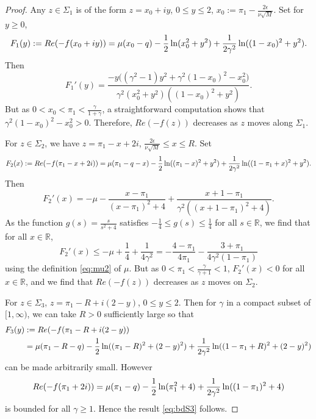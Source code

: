 \documentclass[11pt]{article}
\begin{document}
\begin{proof}
Any $z\in \Sigma_1$ is of the form $z=x_0+iy$, $0\le y\le 2$,
$x_0:=\pi_1-\frac{2\epsilon}{\nu\sqrt{M}}$. Set for $y\ge 0$,
\begin{equation}
  F_1(y):= Re(-f(x_0+iy))
= \mu(x_0-q) - \frac12 \ln(x_0^2+y^2) + \frac1{2\gamma^2}
\ln((1-x_0)^2+y^2).
\end{equation}
Then
\begin{equation}
  F_1'(y) = \frac{-y\bigl((\gamma^2-1)y^2+\gamma^2(1-x_0)^2-x_0^2\bigr)}
{\gamma^2(x_0^2+y^2)((1-x_0)^2+y^2)}.
\end{equation}
But as $0<x_0<\pi_1<\frac{\gamma}{1+\gamma}$, a straightforward
computation shows that $\gamma^2(1-x_0)^2-x_0^2
>0$. Therefore, $Re(-f(z))$
decreases as $z$ moves along $\Sigma_1$.

For $z\in\Sigma_2$, we have $z=\pi_1-x+2i$,
$\frac{2\epsilon}{\nu\sqrt{M}}\le x\le R$. Set
\begin{equation}
  F_2(x):= Re(-f(\pi_1-x+2i))
= \mu(\pi_1-q-x) - \frac12 \ln((\pi_1-x)^2+y^2) +
\frac1{2\gamma^2} \ln((1-\pi_1+x)^2+y^2).
\end{equation}
Then
\begin{equation}
  F_2'(x) = -\mu - \frac{x-\pi_1}{(x-\pi_1)^2+4} + \frac{x+1-\pi_1}{\gamma^2((x+1-\pi_1)^2+4)}.
\end{equation}
As the function $g(s)= \frac{s}{s^2+4}$ satisfies $-\frac14 \le g(s) \le \frac14$ for
all $s\in\mathbb{R}$, we find that for all $x\in\mathbb{R}$,
\begin{equation}
  F_2'(x) \le -\mu + \frac14 + \frac1{4\gamma^2}
= - \frac{4-\pi_1}{4\pi_1} - \frac{3+\pi_1}{4\gamma^2(1-\pi_1)}
\end{equation}
using the definition \eqref{eq:mu2} of $\mu$. But as
$0<\pi_1<\frac{\gamma}{\gamma+1}<1$, $F_2'(x)<0$ for all
$x\in\mathbb{R}$, and we find that $Re(-f(z))$ decreases as $z$
moves on $\Sigma_2$.

For $z\in\Sigma_3$, $z=\pi_1-R+i(2-y)$, $0\le y\le 2$. Then
for $\gamma$ in a compact subset of $[1,\infty)$, we can take $R>0$ sufficiently large
so that
\begin{equation}
\begin{split}
  F_3(y) &:= Re(-f(\pi_1-R+i(2-y)) \\
&= \mu (\pi_1-R-q) - \frac12 \ln((\pi_1-R)^2+(2-y)^2)
+ \frac1{2\gamma^2}\ln((1-\pi_1+R)^2+(2-y)^2)
\end{split}
\end{equation}
can be made arbitrarily small. However
\begin{equation}
  Re(-f(\pi_1+2i)) =
\mu (\pi_1-q) - \frac12 \ln(\pi_1^2+4)
+ \frac1{2\gamma^2}\ln((1-\pi_1)^2+4)
\end{equation}
is bounded for all $\gamma\ge 1$. Hence the result \eqref{eq:bdS3} follows.
\end{proof}
\end{document}
